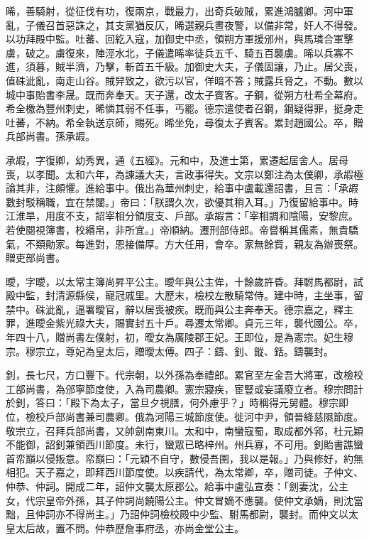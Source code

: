\begin{pinyinscope}
 晞，善騎射，從征伐有功，復兩京，戰最力，出奇兵破賊，累進鴻臚卿。河中軍亂，子儀召首惡誅之，其支黨猶反仄，晞選親兵晝夜警，以備非常，奸人不得發。以功拜殿中監。吐蕃、回紇入寇，加御史中丞，領朔方軍援邠州，與馬璘合軍擊虜，破之。虜復來，陣涇水北，子儀遣晞率徒兵五千、騎五百襲虜。晞以兵寡不進，須暮，賊半濟，乃擊，斬首五千級。加御史大夫，子儀固讓，乃止。居父喪，值硃泚亂，南走山谷。賊舁致之，欲污以官，佯暗不答；賊露兵脅之，不動。數以城中事貽書李晟。既而奔奉天。天子還，改太子賓客。子鋼，從朔方杜希全幕府。希全檄為豐州刺史，晞憐其弱不任事，丐罷。德宗遣使者召鋼，鋼疑得罪，挺身走吐蕃，不納。希全執送京師，賜死。晞坐免，尋復太子賓客。累封趙國公。卒，贈兵部尚書。孫承嘏。



 承嘏，字復卿，幼秀異，通《五經》。元和中，及進士第，累遷起居舍人。居母喪，以孝聞。太和六年，為諫議大夫，言政事得失。文宗以鄭注為太僕卿，承嘏極論其非，注頗懼。進給事中。俄出為華州刺史，給事中盧載還詔書，且言：「承嘏數封駁稱職，宜在禁闥。」帝曰：「朕謂久次，欲優其稍入耳。」乃復留給事中。時江淮旱，用度不支，詔宰相分領度支、戶部。承嘏言：「宰相調和陰陽，安黎庶。若使閱視簿書，校緡帛，非所宜。」帝順納。遷刑部侍郎。帝嘗稱其儒素，無貴驕氣，不類勛家。每進對，恩接備厚。方大任用，會卒。家無餘貲，親友為辦喪祭。贈吏部尚書。



 曖，字曖，以太常主簿尚昇平公主。曖年與公主侔，十餘歲許昏。拜駙馬都尉，試殿中監，封清源縣侯，寵冠戚里。大歷末，檢校左散騎常侍。建中時，主坐事，留禁中。硃泚亂，逼署曖官，辭以居喪被疾。既而與公主奔奉天。德宗嘉之，釋主罪，進曖金紫光祿大夫，賜實封五十戶。尋遷太常卿。貞元三年，襲代國公。卒，年四十八，贈尚書左僕射，初，曖女為廣陵郡王妃。王即位，是為憲宗。妃生穆宗。穆宗立，尊妃為皇太后，贈曖太傅。四子：鑄、釗、鏦、銛。鑄襲封。



 釗，長七尺，方口豐下。代宗朝，以外孫為奉禮郎。累官至左金吾大將軍，改檢校工部尚書，為邠寧節度使，入為司農卿。憲宗寢疾，宦豎或妄議廢立者。穆宗問計於釗，答曰：「殿下為太子，當旦夕視膳，何外慮乎？」時稱得元舅體。穆宗即位，檢校戶部尚書兼司農卿。俄為河陽三城節度使。徙河中尹，領晉絳慈隰節度。敬宗立，召拜兵部尚書，又帥劍南東川。太和中，南蠻寇蜀，取成都外郛，杜元穎不能御，詔釗兼領西川節度。未行，蠻眾已略梓州。州兵寡，不可用。釗貽書譙蠻首帟巔以侵叛意。帟巔曰：「元穎不自守，數侵吾圉，我以是報。」乃與修好，約無相犯。天子嘉之，即拜西川節度使。以疾請代，為太常卿，卒，贈司徒。子仲文、仲恭、仲詞。開成二年，詔仲文襲太原郡公。給事中盧弘宣奏：「劍妻沈，公主女，代宗皇帝外孫，其子仲詞尚饒陽公主。仲文冒嫡不應襲。使仲文承嫡，則沈當黜，且仲詞亦不得尚主。」乃詔仲詞檢校殿中少監、駙馬都尉，襲封。而仲文以太皇太后故，置不問。仲恭歷詹事府丞，亦尚金堂公主。




\end{pinyinscope}
